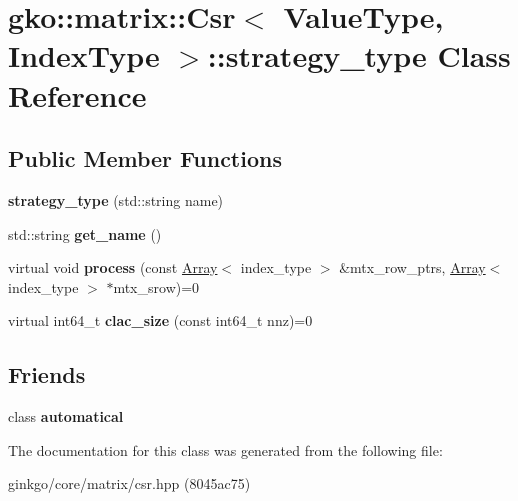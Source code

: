 \hypertarget{classgko_1_1matrix_1_1Csr_1_1strategy__type}{}\section{gko\+:\+:matrix\+:\+:Csr$<$ Value\+Type, Index\+Type $>$\+:\+:strategy\+\_\+type Class Reference}
\label{classgko_1_1matrix_1_1Csr_1_1strategy__type}
\subsection*{Public Member Functions}
\begin{DoxyCompactItemize}
\item 
\mbox{\label{classgko_1_1matrix_1_1Csr_1_1strategy__type_aae6804f7a0b899f03bc0d5e0f139129c}} 
{\bfseries strategy\+\_\+type} (std\+::string name)
\item 
\mbox{\label{classgko_1_1matrix_1_1Csr_1_1strategy__type_a0c22b251b0c1dfd087a5c097488febe0}} 
std\+::string {\bfseries get\+\_\+name} ()
\item 
\mbox{\label{classgko_1_1matrix_1_1Csr_1_1strategy__type_a58bda9208766e57d861262d4059b65b4}} 
virtual void {\bfseries process} (const \hyperlink{classgko_1_1Array}{Array}$<$ index\+\_\+type $>$ \&mtx\+\_\+row\+\_\+ptrs, \hyperlink{classgko_1_1Array}{Array}$<$ index\+\_\+type $>$ $\ast$mtx\+\_\+srow)=0
\item 
\mbox{\label{classgko_1_1matrix_1_1Csr_1_1strategy__type_a07a6dda9dd04ed8abd914f3a69f330f2}} 
virtual int64\+\_\+t {\bfseries clac\+\_\+size} (const int64\+\_\+t nnz)=0
\end{DoxyCompactItemize}
\subsection*{Friends}
\begin{DoxyCompactItemize}
\item 
\mbox{\label{classgko_1_1matrix_1_1Csr_1_1strategy__type_a9e1e07b9f14479534a4043eefd6320cc}} 
class {\bfseries automatical}
\end{DoxyCompactItemize}


The documentation for this class was generated from the following file\+:\begin{DoxyCompactItemize}
\item 
ginkgo/core/matrix/csr.\+hpp (8045ac75)\end{DoxyCompactItemize}
